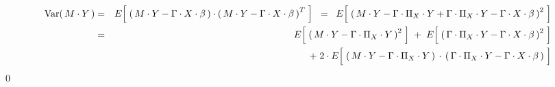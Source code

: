 \begin{eqnarray*}
\Var\!\left(\,M \cdot Y\,\right)
&=&
	E\!\left[\;
		\left(\,M \cdot Y - \Gamma \cdot X \cdot \beta\,\right)
		\cdot
		\left(\,M \cdot Y - \Gamma \cdot X \cdot \beta\,\right)^{T}
		\;\right]
\;\;=\;\;
	E\!\left[\;\left(\,
		M \cdot Y
		- \Gamma \cdot \Pi_{X} \cdot Y
		+ \Gamma \cdot \Pi_{X} \cdot Y
		- \Gamma \cdot X \cdot \beta
		\,\right)^{2}\;\right]
\\
&=&
	E\!\left[\;\left(\,
		M \cdot Y - \Gamma \cdot \Pi_{X} \cdot Y
		\,\right)^{2}\;\right]
	\;+\;
	E\!\left[\;\left(\,
		\Gamma \cdot \Pi_{X} \cdot Y - \Gamma \cdot X \cdot \beta
		\,\right)^{2}\;\right]
\\
&&
	\;+\;
	2 \cdot
	E\!\left[\;
		\left(\,M \cdot Y - \Gamma \cdot \Pi_{X} \cdot Y\,\right)
		\overset{{\color{white}+}}{\cdot}
		\left(\,\Gamma \cdot \Pi_{X} \cdot Y - \Gamma \cdot X \cdot \beta\,\right)
		\;\right]
\end{eqnarray*}
\qed


